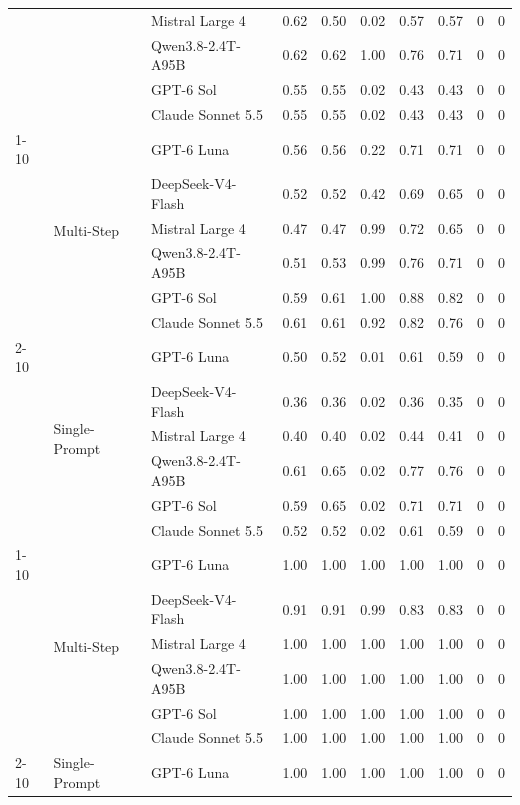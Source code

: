 \begin{tabular}{lllrrrrrrr}
 &  & Mistral Large 4 & 0.62 & 0.50 & 0.02 & 0.57 & 0.57 & 0 & 0 \\
 &  & Qwen3.8-2.4T-A95B & 0.62 & 0.62 & 1.00 & 0.76 & 0.71 & 0 & 0 \\
 &  & GPT-6 Sol & 0.55 & 0.55 & 0.02 & 0.43 & 0.43 & 0 & 0 \\
 &  & Claude Sonnet 5.5 & 0.55 & 0.55 & 0.02 & 0.43 & 0.43 & 0 & 0 \\
\cline{1-10} \cline{2-10}
\multirow[t]{12}{*}{sisu} & \multirow[t]{6}{*}{Multi-Step} & GPT-6 Luna & 0.56 & 0.56 & 0.22 & 0.71 & 0.71 & 0 & 0 \\
 &  & DeepSeek-V4-Flash & 0.52 & 0.52 & 0.42 & 0.69 & 0.65 & 0 & 0 \\
 &  & Mistral Large 4 & 0.47 & 0.47 & 0.99 & 0.72 & 0.65 & 0 & 0 \\
 &  & Qwen3.8-2.4T-A95B & 0.51 & 0.53 & 0.99 & 0.76 & 0.71 & 0 & 0 \\
 &  & GPT-6 Sol & 0.59 & 0.61 & 1.00 & 0.88 & 0.82 & 0 & 0 \\
 &  & Claude Sonnet 5.5 & 0.61 & 0.61 & 0.92 & 0.82 & 0.76 & 0 & 0 \\
\cline{2-10}
 & \multirow[t]{6}{*}{Single-Prompt} & GPT-6 Luna & 0.50 & 0.52 & 0.01 & 0.61 & 0.59 & 0 & 0 \\
 &  & DeepSeek-V4-Flash & 0.36 & 0.36 & 0.02 & 0.36 & 0.35 & 0 & 0 \\
 &  & Mistral Large 4 & 0.40 & 0.40 & 0.02 & 0.44 & 0.41 & 0 & 0 \\
 &  & Qwen3.8-2.4T-A95B & 0.61 & 0.65 & 0.02 & 0.77 & 0.76 & 0 & 0 \\
 &  & GPT-6 Sol & 0.59 & 0.65 & 0.02 & 0.71 & 0.71 & 0 & 0 \\
 &  & Claude Sonnet 5.5 & 0.52 & 0.52 & 0.02 & 0.61 & 0.59 & 0 & 0 \\
\cline{1-10} \cline{2-10}
\multirow[t]{12}{*}{tax} & \multirow[t]{6}{*}{Multi-Step} & GPT-6 Luna & 1.00 & 1.00 & 1.00 & 1.00 & 1.00 & 0 & 0 \\
 &  & DeepSeek-V4-Flash & 0.91 & 0.91 & 0.99 & 0.83 & 0.83 & 0 & 0 \\
 &  & Mistral Large 4 & 1.00 & 1.00 & 1.00 & 1.00 & 1.00 & 0 & 0 \\
 &  & Qwen3.8-2.4T-A95B & 1.00 & 1.00 & 1.00 & 1.00 & 1.00 & 0 & 0 \\
 &  & GPT-6 Sol & 1.00 & 1.00 & 1.00 & 1.00 & 1.00 & 0 & 0 \\
 &  & Claude Sonnet 5.5 & 1.00 & 1.00 & 1.00 & 1.00 & 1.00 & 0 & 0 \\
\cline{2-10}
 & \multirow[t]{6}{*}{Single-Prompt} & GPT-6 Luna & 1.00 & 1.00 & 1.00 & 1.00 & 1.00 & 0 & 0 \\

\end{tabular}
